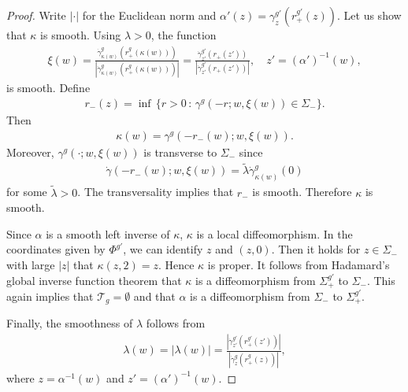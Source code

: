 \documentclass[10pt,a4paper]{amsart}
\begin{document}
\begin{proof}
Write $|\cdot|$ for the Euclidean norm and $\alpha'(z) = \gamma_z^{g'}(r_+^{g'}(z))$. Let us show that $\kappa$ is smooth. 
Using $\lambda > 0$, the function 
    \begin{align*}
\xi(w) 
= 
\frac{\dot \gamma_{\kappa(w)}^{g}(r_+^{g}(\kappa(w)))}
{|\dot \gamma_{\kappa(w)}^{g}(r_+^{g}(\kappa(w)))|} 
= 
\frac{\dot \gamma^{g'}_{z'}(r_+(z'))}
{|\dot \gamma^{g'}_{z'}(r_+(z'))|},
\quad 
z' = (\alpha')^{-1}(w),
    \end{align*}
is smooth. Define
    \begin{align*}
r_-(z) = \inf \,\{ r > 0 \,:\, \gamma^{g}(-r; w, \xi(w)) \in \Sigma_- \}.
    \end{align*}
Then
    \begin{align*}
\kappa(w) = \gamma^{g}(-r_-(w); w,\xi(w)).
    \end{align*}
Moreover, $\gamma^{g}(\cdot; w,\xi(w))$ is transverse to $\Sigma_-$ since
    \begin{align*}
\dot \gamma(-r_-(w); w,\xi(w))
=
\tilde \lambda \dot \gamma_{\kappa(w)}^{g}(0)
    \end{align*}
for some $\tilde \lambda > 0$.
The transversality implies that $r_-$ is smooth. Therefore $\kappa$ is smooth.

Since $\alpha$ is a smooth left inverse of $\kappa$, $\kappa$ is a local diffeomorphism. In the coordinates given by $\Phi^{g'}$, we can identify $z$ and $(z, 0)$. Then it holds for $z \in \Sigma_-$ with large $|z|$ that $\kappa(z, 2) = z$. Hence $\kappa$ is proper. It follows from Hadamard's global inverse function theorem that $\kappa$ is a diffeomorphism from $\Sigma_+^{g'}$ to $\Sigma_-$. This again implies that $\mathcal T_{g} = \emptyset$ and that $\alpha$ is a diffeomorphism from $\Sigma_-$ to $\Sigma_+^{g'}$.

Finally, the smoothness of $\lambda$ follows from 
    \begin{align*}
\lambda(w) = |\lambda(w)| = \frac{|\dot \gamma_{z'}^{g'}(r_+^{g'}(z'))|}{|\dot \gamma_z^g(r_+^{g}(z))|},
    \end{align*}
where $z = \alpha^{-1}(w)$ and $z' = (\alpha')^{-1}(w)$.
\end{proof}
\end{document}

